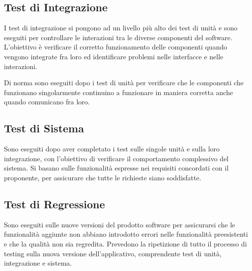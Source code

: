 \subsection{Test di Integrazione}
\par I test di integrazione si pongono ad un livello più alto dei test di unità e sono eseguiti per controllare le interazioni tra le diverse componenti del software. L'obiettivo è verificare il corretto funzionamento delle componenti quando vengono integrate fra loro ed identificare problemi nelle interfacce e nelle interazioni.
\par Di norma sono eseguiti dopo i test di unità per verificare che le componenti che funzionano singolarmente continuino a funzionare in maniera corretta anche quando comunicano fra loro.

\subsection{Test di Sistema}
\par Sono eseguiti dopo aver completato i test sulle singole unità e sulla loro integrazione, con l'obiettivo di verificare il comportamento complessivo del sistema. Si basano sulle funzionalità espresse nei requisiti concordati con il proponente, per assicurare che tutte le richieste siano soddisfatte.

\subsection{Test di Regressione}
\par Sono eseguiti sulle nuove versioni del prodotto software per assicurarsi che le funzionalità aggiunte non abbiano introdotto errori nelle funzionalità preesistenti e che la qualità non sia regredita. Prevedono la ripetizione di tutto il processo di testing sulla nuova versione dell'applicativo, comprendente test di unità, integrazione e sistema.
\begin{comment}
    \subsection{Test di Usabilità}
\par Valutazione dell'esperienza dell'utente con l'interfaccia del software, per garantire intuitività e facilità di uso.

\subsection{Test di Prestazione}
\par Controlli sulle prestazioni del software sotto vari carichi di lavoro, valutando tempo di risposta e scalabilità.
\end{comment}

